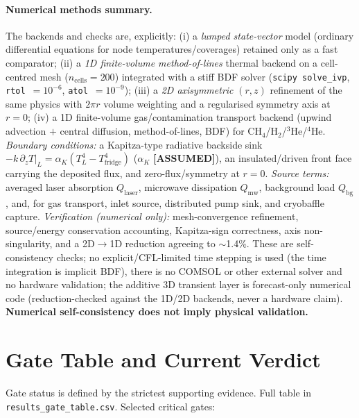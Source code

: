 \documentclass[12pt,a4paper]{article}
\newcommand{\assumed}{\textbf{[ASSUMED]}}
\begin{document}
\paragraph{Numerical methods summary.} The backends and checks are, explicitly:
(i) a \emph{lumped state-vector} model (ordinary differential equations for node
temperatures/coverages) retained only as a fast comparator; (ii) a \emph{1D
finite-volume method-of-lines} thermal backend on a cell-centred mesh
($n_\mathrm{cells}=200$) integrated with a stiff BDF solver (\texttt{scipy
solve\_ivp}, \texttt{rtol}~$=10^{-6}$, \texttt{atol}~$=10^{-9}$); (iii) a \emph{2D
axisymmetric} $(r,z)$ refinement of the same physics with $2\pi r$ volume
weighting and a regularised symmetry axis at $r=0$; (iv) a 1D finite-volume
gas/contamination transport backend (upwind advection $+$ central diffusion,
method-of-lines, BDF) for CH$_4$/H$_2$/$^3$He/$^4$He. \emph{Boundary conditions:}
a Kapitza-type radiative backside sink
$-k\,\partial_z T|_L=\alpha_K(T_L^4-T_\mathrm{fridge}^4)$ ($\alpha_K$ \assumed{}),
an insulated/driven front face carrying the deposited flux, and zero-flux/symmetry
at $r=0$. \emph{Source terms:} averaged laser absorption $Q_\mathrm{laser}$,
microwave dissipation $Q_\mathrm{mw}$, background load $Q_\mathrm{bg}$, and, for gas
transport, inlet source, distributed pump sink, and cryobaffle capture.
\emph{Verification (numerical only):} mesh-convergence refinement, source/energy
conservation accounting, Kapitza-sign correctness, axis non-singularity, and a
2D$\rightarrow$1D reduction agreeing to $\sim$1.4\%. These are self-consistency
checks; no explicit/CFL-limited time stepping is used (the time integration is
implicit BDF), there is no COMSOL or other external solver and no hardware
validation; the additive 3D transient layer is forecast-only numerical code
(reduction-checked against the 1D/2D backends, never a hardware claim).
\textbf{Numerical self-consistency does not imply physical validation.}

\section{Gate Table and Current Verdict}
\label{sec:gates}

Gate status is defined by the strictest supporting evidence.
Full table in \texttt{results\_gate\_table.csv}.
Selected critical gates:
\end{document}
